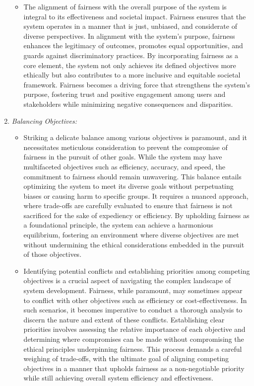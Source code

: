 \documentclass[12pt,a4paper,openright,twoside]{book}
\begin{document}
\begin{enumerate}
\begin{itemize}
            \item The alignment of fairness with the overall purpose of the system is integral to its effectiveness and societal impact. Fairness ensures that the system operates in a manner that is just, unbiased, and considerate of diverse perspectives. In alignment with the system's purpose, fairness enhances the legitimacy of outcomes, promotes equal opportunities, and guards against discriminatory practices. By incorporating fairness as a core element, the system not only achieves its defined objectives more ethically but also contributes to a more inclusive and equitable societal framework. Fairness becomes a driving force that strengthens the system's purpose, fostering trust and positive engagement among users and stakeholders while minimizing negative consequences and disparities.
        
        \end{itemize}
    
    \item \emph{Balancing Objectives:}

        \begin{itemize}
            
            \item Striking a delicate balance among various objectives is paramount, and it necessitates meticulous consideration to prevent the compromise of fairness in the pursuit of other goals. While the system may have multifaceted objectives such as efficiency, accuracy, and speed, the commitment to fairness should remain unwavering. This balance entails optimizing the system to meet its diverse goals without perpetuating biases or causing harm to specific groups. It requires a nuanced approach, where trade-offs are carefully evaluated to ensure that fairness is not sacrificed for the sake of expediency or efficiency. By upholding fairness as a foundational principle, the system can achieve a harmonious equilibrium, fostering an environment where diverse objectives are met without undermining the ethical considerations embedded in the pursuit of those objectives.
            
            \item Identifying potential conflicts and establishing priorities among competing objectives is a crucial aspect of navigating the complex landscape of system development. Fairness, while paramount, may sometimes appear to conflict with other objectives such as efficiency or cost-effectiveness. In such scenarios, it becomes imperative to conduct a thorough analysis to discern the nature and extent of these conflicts. Establishing clear priorities involves assessing the relative importance of each objective and determining where compromises can be made without compromising the ethical principles underpinning fairness. This process demands a careful weighing of trade-offs, with the ultimate goal of aligning competing objectives in a manner that upholds fairness as a non-negotiable priority while still achieving overall system efficiency and effectiveness.
        

\end{itemize}
\end{enumerate}
\end{document}
